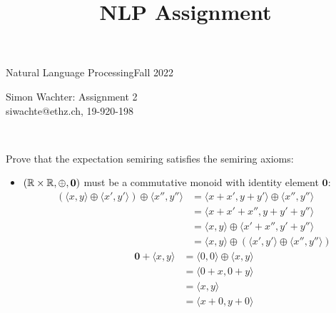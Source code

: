 \documentclass[a4paper,12pt]{ETHexercise}
\title{NLP Assignment}
\begin{document}


\newcommand{\pair}[2]{{\langle #1 , #2 \rangle}}
\newcommand{\score}[2]{\text{score}(#1, #2, \mathbf{w})}

{}
{\Large Natural Language Processing}{Fall 2022}
\begin{center}
  {\Huge Simon Wachter: Assignment 2}\\
  \quad\newline
  siwachte@ethz.ch, 19-920-198\\
  \quad\newline
  \timestamp
\end{center}

\begin{question}\\
  \begin{subquestion}
    Prove that the expectation semiring satisfies the semiring axioms:\\
    \begin{itemize}
      \item  $(\mathbb{R} \times \mathbb{R}, \oplus, \mathbf{0})$ must be a commutative monoid with identity element $\mathbf{0}$:
            \begin{align}
              \left(\pair{x}{y} \oplus \pair{x'}{y'}\right) \oplus \pair{x''}{y''} & =       \pair{x + x'}{y + y'}      \oplus \pair{x''}{y''}              \\
                                                                                   & = \pair{x + x' + x''}{y + y' + y''}                                    \\
                                                                                   & = \pair{x}{y} \oplus \pair{x' + x''}{y' + y''}                         \\
                                                                                   & = \pair{x}{y} \oplus \left(\pair{x'}{y'} \oplus \pair{x''}{y''}\right)
            \end{align}
            \begin{align}
              \mathbf{0} + \pair{x}{y} & = \pair{0}{0} \oplus \pair{x}{y} \\
                                       & = \pair{0 + x}{0 + y}            \\
                                       & = \pair{x}{y}                    \\
                                       & = \pair{x + 0}{y + 0}            \\

\end{align}
\end{itemize}
\end{subquestion}
\end{question}
\end{document}
